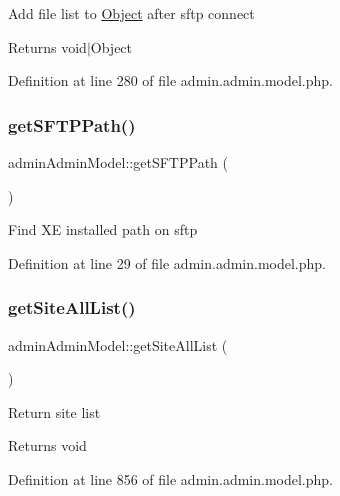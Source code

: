 Add file list to \hyperlink{classObject}{Object} after sftp connect \begin{DoxyReturn}{Returns}
void$\vert$\+Object 
\end{DoxyReturn}


Definition at line 280 of file admin.\+admin.\+model.\+php.

\mbox{\label{classadminAdminModel_aaeac1a0a11439dfb4faa74751da8747e}} 
\subsubsection{\texorpdfstring{get\+S\+F\+T\+P\+Path()}{getSFTPPath()}}
{\footnotesize\ttfamily admin\+Admin\+Model\+::get\+S\+F\+T\+P\+Path (\begin{DoxyParamCaption}{ }\end{DoxyParamCaption})}

Find XE installed path on sftp 

Definition at line 29 of file admin.\+admin.\+model.\+php.

\mbox{\label{classadminAdminModel_a12f25a1c61e11bf727019171564b1cad}} 
\subsubsection{\texorpdfstring{get\+Site\+All\+List()}{getSiteAllList()}}
{\footnotesize\ttfamily admin\+Admin\+Model\+::get\+Site\+All\+List (\begin{DoxyParamCaption}{ }\end{DoxyParamCaption})}

Return site list \begin{DoxyReturn}{Returns}
void 
\end{DoxyReturn}


Definition at line 856 of file admin.\+admin.\+model.\+php.

\mbox{\label{classadminAdminModel_aed8487a6deb0041ea43b2cd66a6339c0}} 
